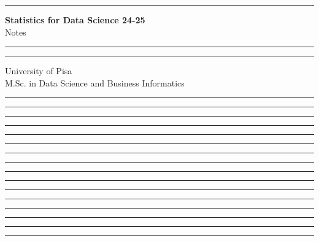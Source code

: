 \documentclass[11pt]{article}
\newcommand{\separate}{\begin{center}\textcolor{NavyBlue}{\rule{16cm}{1mm}}\end{center}}
\begin{document}
\begin{titlepage}
    \hrule
    \vspace{15pt}
    \begin{center}
        \Huge{\textbf{\Huge \textbf{Statistics for Data Science 24-25}} \\ Notes}\\
    \end{center}
    \vspace{15pt}
    \hrule
    \vfill
    \hrule
    \begin{center}
        \Large University of Pisa \\ M.Sc. in Data Science and Business Informatics
    \end{center}
\end{titlepage}

\tableofcontents
\clearpage


\separate
\separate
\separate
\separate
\separate
\separate
\separate
\separate
\separate
\separate
\separate
\separate
\separate
\separate
\separate
\separate
\end{document}
